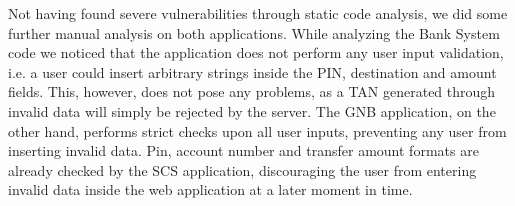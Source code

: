 Not having found severe vulnerabilities through static code analysis, we did some further manual analysis on both applications.\newline
While analyzing the Bank System code we noticed that the application does not perform any user input validation, i.e. a user could insert arbitrary strings inside the PIN, destination and amount fields. This, however, does not pose any problems, as a TAN generated through invalid data will simply be rejected by the server.\newline
The GNB application, on the other hand, performs strict checks upon all user inputs, preventing any user from inserting invalid data. Pin, account number and transfer amount formats are already checked by the SCS application, discouraging the user from entering invalid data inside the web application at a later moment in time.

\clearpage
